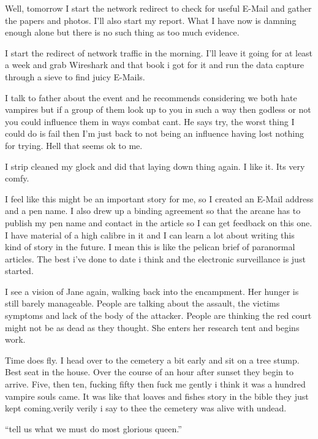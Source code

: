 Well, tomorrow I start the network redirect to check for useful E-Mail and gather the papers and photos. I'll also start my report. What I have now is damning enough alone but there is no such thing as too much evidence.

I start the redirect of network traffic in the morning. I'll leave it going for at least a week and grab Wireshark and that book i got for it and run the data capture through a sieve to find juicy E-Mails.

I talk to father about the event and he recommends considering we both hate vampires but if a group of them look up to you in such a way then godless or not you could influence them in ways combat cant. He says try, the worst thing I could do is fail then I'm just back to not being an influence having lost nothing for trying. Hell that seems ok to me.

I strip cleaned my glock and did that laying down thing again. I like it. Its very comfy.

I feel like this might be an important story for me, so I created an E-Mail address and a pen name. I also drew up a binding agreement so that the arcane has to publish my pen name and contact in the article so I can get feedback on this one. I have material of a high calibre in it and I can learn a lot about writing this kind of story in the future. I mean this is like the pelican brief of paranormal articles. The best i've done to date i think and the electronic surveillance is just started.

I see a vision of Jane again, walking back into the encampment. Her hunger is still barely manageable. People are talking about the assault, the victims symptoms and lack of the body of the attacker. People are thinking the red court might not be as dead as they thought. She enters her research tent and begins work.

Time does fly. I head over to the cemetery a bit early and sit on a tree stump. Best seat in the house. Over the course of an hour after sunset they begin to arrive. Five, then ten, fucking fifty then fuck me gently i think it was a hundred vampire souls came.  It was like that loaves and fishes story in the bible they just kept coming.verily verily i say to thee the cemetery was alive with undead.

``tell us what we must do most glorious queen.''

